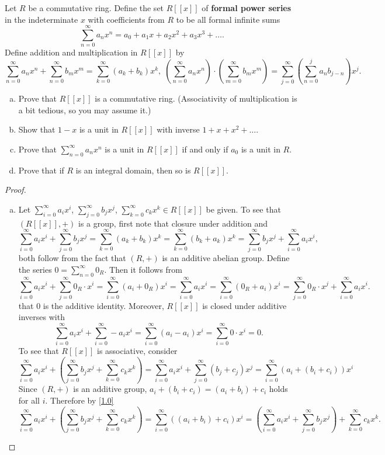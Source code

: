 \documentclass[10pt]{amsart}
\begin{document}
\begin{thm}
  Let $R$ be a commutative ring.
  Define the set $R[[x]]$ of {\bf formal power series} in the indeterminate $x$ with coefficients from $R$ to be all formal infinite sums
  $$\sum_{n=0}^\infty a_nx^n = a_0 + a_1x + a_2 x^2 + a_3x^3 + \ldots.$$
  Define addition and multiplication in $R[[x]]$ by
  $$\sum_{n=0}^\infty a_nx^n + \sum_{n=0}^\infty b_mx^m = \sum_{k=0}^\infty (a_k + b_k)x^k,\; \left(\sum_{n=0}^\infty a_nx^n\right) \cdot \left(\sum_{m=0}^\infty b_mx^m\right) = \sum_{j=0}^\infty\left(\sum_{n=0}^j a_nb_{j-n}\right)x^j.$$
  \begin{enumerate}[(a)]
  \item
    Prove that $R[[x]]$ is a commutative ring.
    (Associativity of multiplication is a bit tedious, so you may assume it.)
  \item
    Show that $1-x$ is a unit in $R[[x]]$ with inverse $1 + x + x^2 + \ldots$.
  \item
    Prove that $\sum_{n=0}^\infty a_nx^n$ is a unit in $R[[x]]$ if and only if $a_0$ is a unit in $R$.
  \item
    Prove that if $R$ is an integral domain, then so is $R[[x]]$.
  \end{enumerate}

  \begin{proof}
    \begin{enumerate}[(a)]
    \item
      Let $\sum_{i=0}^\infty a_ix^i$, $\sum_{j=0}^\infty b_jx^j$, $\sum_{k=0}^\infty c_kx^k \in R[[x]]$ be given.
      To see that $(R[[x]], +)$ is a group, first note that closure under addition and
      $$\sum_{i=0}^\infty a_ix^i + \sum_{j=0}^\infty b_jx^j = \sum_{k=0}^\infty (a_k + b_k)x^k = \sum_{k=0}^\infty (b_k + a_k)x^k = \sum_{j=0}^\infty b_jx^j + \sum_{i=0}^\infty a_ix^i,$$
      both follow from the fact that $(R, +)$ is an additive abelian group.
      Define the series $0 = \sum_{n=0}^\infty 0_R$.
      Then it follows from
      $$\sum_{i=0}^\infty a_ix^i + \sum_{j=0}^\infty 0_R\cdot x^i = \sum_{i=0}^\infty (a_i + 0_R)x^i = \sum_{i=0}^\infty a_ix^i = \sum_{i=0}^\infty (0_R + a_i)x^i = \sum_{j=0}^\infty 0_R\cdot x^j + \sum_{i=0}^\infty a_ix^i.$$
      that $0$ is the additive identity.
      Moreover, $R[[x]]$ is closed under additive inverses with
      $$\sum_{i=0}^\infty a_ix^i + \sum_{i=0}^\infty -a_ix^i = \sum_{i=0}^\infty (a_i - a_i)x^i = \sum_{i=0}^\infty 0\cdot x^i = 0.$$
      To see that $R[[x]]$ is associative, consider 
      \begin{equation}\label{1.0}
        \sum_{i=0}^\infty a_ix^i + \left(\sum_{j=0}^\infty b_jx^j + \sum_{k=0}^\infty c_kx^k\right)  = \sum_{i=0}^\infty a_ix^i + \sum_{j=0}^\infty (b_j + c_j)x^j = \sum_{i=0}^\infty \left(a_i + (b_i + c_i)\right)x^i
      \end{equation}
      Since $(R,+)$ is an additive group, $a_i + (b_i + c_i) = (a_i + b_i) + c_i$ holds for all $i$.
      Therefore by \eqref{1.0}
      $$\sum_{i=0}^\infty a_ix^i + \left(\sum_{j=0}^\infty b_jx^j + \sum_{k=0}^\infty c_kx^k\right) = \sum_{i=0}^\infty \left((a_i + b_i) + c_i\right)x^i= \left(\sum_{i=0}^\infty a_ix^i + \sum_{j=0}^\infty b_jx^j\right) + \sum_{k=0}^\infty c_kx^k.$$
      

\end{enumerate}
\end{proof}
\end{thm}
\end{document}
